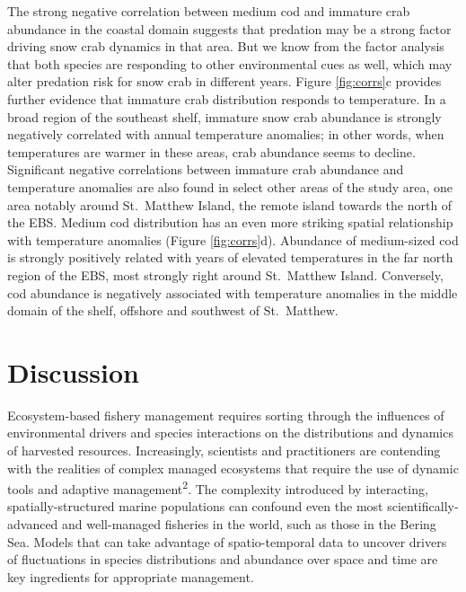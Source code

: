\documentclass[11pt,]{article}
\begin{document}
The strong negative correlation between medium cod and immature crab abundance in the coastal domain suggests that predation may be a strong factor driving snow crab dynamics in that area. But we know from the factor analysis that both species are responding to other environmental cues as well, which may alter predation risk for snow crab in different years. Figure \ref{fig:corrs}c provides further evidence that immature crab distribution responds to temperature. In a broad region of the southeast shelf, immature snow crab abundance is strongly negatively correlated with annual temperature anomalies; in other words, when temperatures are warmer in these areas, crab abundance seems to decline. Significant negative correlations between immature crab abundance and temperature anomalies are also found in select other areas of the study area, one area notably around St.~Matthew Island, the remote island towards the north of the EBS. Medium cod distribution has an even more striking spatial relationship with temperature anomalies (Figure \ref{fig:corrs}d). Abundance of medium-sized cod is strongly positively related with years of elevated temperatures in the far north region of the EBS, most strongly right around St.~Matthew Island. Conversely, cod abundance is negatively associated with temperature anomalies in the middle domain of the shelf, offshore and southwest of St.~Matthew.

\hypertarget{discussion}{%
\section{Discussion}\label{discussion}}

Ecosystem-based fishery management requires sorting through the influences of environmental drivers and species interactions on the distributions and dynamics of harvested resources. Increasingly, scientists and practitioners are contending with the realities of complex managed ecosystems that require the use of dynamic tools and adaptive management\textsuperscript{2}. The complexity introduced by interacting, spatially-structured marine populations can confound even the most scientifically-advanced and well-managed fisheries in the world, such as those in the Bering Sea. Models that can take advantage of spatio-temporal data to uncover drivers of fluctuations in species distributions and abundance over space and time are key ingredients for appropriate management.
\end{document}
